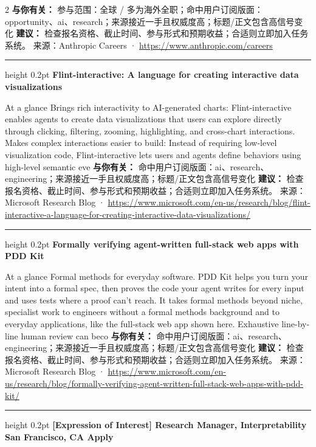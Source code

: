 \documentclass[10.5pt]{ctexart}
\begin{document}
\begin{multicols}{2}
\textbf{与你有关：} 参与范围：全球 / 多为海外全职；命中用户订阅版面：opportunity、ai、research；来源接近一手且权威度高；标题/正文包含高信号变化
\textbf{建议：} 检查报名资格、截止时间、参与形式和预期收益；合适则立即加入任务系统。
{\footnotesize\color{ormuted} 来源：Anthropic Careers · \url{https://www.anthropic.com/careers}}
\vspace{2mm}
\hrule height 0.2pt
\vspace{2mm}
{\large\bfseries Flint-interactive: A language for creating interactive data visualizations}\par
At a glance Brings rich interactivity to AI-generated charts: Flint-interactive enables agents to create data visualizations that users can explore directly through clicking, filtering, zooming, highlighting, and cross-chart interactions. Makes complex interactions easier to build: Instead of requiring low-level visualization code, Flint-interactive lets users and agents define behaviors using high-level semantic eve
\textbf{与你有关：} 命中用户订阅版面：ai、research、engineering；来源接近一手且权威度高；标题/正文包含高信号变化
\textbf{建议：} 检查报名资格、截止时间、参与形式和预期收益；合适则立即加入任务系统。
{\footnotesize\color{ormuted} 来源：Microsoft Research Blog · \url{https://www.microsoft.com/en-us/research/blog/flint-interactive-a-language-for-creating-interactive-data-visualizations/}}
\vspace{2mm}
\hrule height 0.2pt
\vspace{2mm}
{\large\bfseries Formally verifying agent-written full-stack web apps with PDD Kit}\par
At a glance Formal methods for everyday software. PDD Kit helps you turn your intent into a formal spec, then proves the code your agent writes for every input and uses tests where a proof can’t reach. It takes formal methods beyond niche, specialist work to engineers without a formal methods background and to everyday applications, like the full-stack web app shown here. Exhaustive line-by-line human review can beco
\textbf{与你有关：} 命中用户订阅版面：ai、research、engineering；来源接近一手且权威度高；标题/正文包含高信号变化
\textbf{建议：} 检查报名资格、截止时间、参与形式和预期收益；合适则立即加入任务系统。
{\footnotesize\color{ormuted} 来源：Microsoft Research Blog · \url{https://www.microsoft.com/en-us/research/blog/formally-verifying-agent-written-full-stack-web-apps-with-pdd-kit/}}
\vspace{2mm}
\hrule height 0.2pt
\vspace{2mm}
{\large\bfseries [Expression of Interest] Research Manager, Interpretability San Francisco, CA Apply}\par

\end{multicols}
\end{document}
